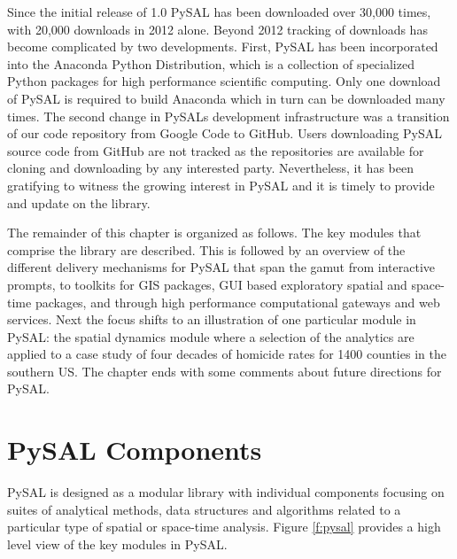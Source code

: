 \documentclass[11pt, titlepage]{article}
\begin{document}
Since the initial release of 1.0 PySAL has been downloaded over 30,000
times, with 20,000 downloads in 2012 alone. Beyond 2012 tracking of
downloads has become complicated by two developments. First, PySAL has
been incorporated into the Anaconda Python Distribution, which is a
collection of specialized Python packages for high performance
scientific computing. Only one download of PySAL is required to build
Anaconda which in turn can be downloaded many times. The second change
in PySALs development infrastructure was a transition of our code
repository from Google Code to GitHub. Users downloading PySAL source
code from GitHub are not tracked as the repositories are available for
cloning and downloading by any interested party. Nevertheless, it has
been gratifying to witness the growing interest in PySAL and it is
timely to provide and update on the library.

The remainder of this chapter is organized as follows. The key modules
that comprise the library are described. This is followed by an overview
of the different delivery mechanisms for PySAL that span the gamut from
interactive prompts, to toolkits for GIS packages, GUI based exploratory
spatial and space-time packages, and through high performance
computational gateways and web services. Next the focus shifts to an
illustration of one particular module in PySAL: the spatial dynamics
module where a selection of the analytics are applied to a case study of
four decades of homicide rates for 1400 counties in the southern US. The
chapter ends with some comments about future directions for PySAL.

\section{PySAL Components}

PySAL is designed as a modular library with individual components
focusing on suites of analytical methods, data structures and algorithms
related to a particular type of spatial or space-time analysis. Figure
\ref{f:pysal} provides a high level view of the key modules in PySAL.
\end{document}
